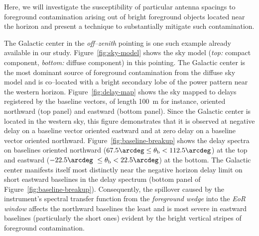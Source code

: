 \documentclass[preprint2,iop,numberedappendix]{emulateapj}
\begin{document}
Here, we will investigate the susceptibility of particular antenna spacings to foreground contamination arising out of bright foreground objects located near the horizon and present a technique to substantially mitigate such contamination.

The Galactic center in the {\it off--zenith} pointing is one such example already available in our study. Figure~\ref{fig:sky-model} shows the sky model ({\it top:} compact component, {\it bottom:} diffuse component) in this pointing. The Galactic center is the most dominant source of foreground contamination from the diffuse sky model and is co--located with a bright secondary lobe of the power pattern near the western horizon. Figure~\ref{fig:delay-map} shows the sky mapped to delays registered by the baseline vectors, of length 100~m for instance, oriented northward (top panel) and eastward (bottom panel). Since the Galactic center is located in the western sky, this figure demonstrates that it is observed at negative delay on a baseline vector oriented eastward and at zero delay on a baseline vector oriented northward. Figure~\ref{fig:baseline-breakup} shows the delay spectra on baselines oriented northward ($67.5\arcdeg\le \theta_\textrm{b} < 112.5\arcdeg$) at the top and eastward ($-22.5\arcdeg~\le \theta_\textrm{b} < 22.5\arcdeg$) at the bottom. The Galactic center manifests itself most distinctly near the negative horizon delay limit on short eastward baselines in the delay spectrum (bottom panel of Figure~\ref{fig:baseline-breakup}). Consequently, the spillover caused by the instrument's spectral transfer function from the {\it foreground wedge} into the {\it EoR window} affects the northward baselines the least and is most severe in eastward baselines (particularly the short ones) evident by the bright vertical stripes of foreground contamination. 
\end{document}
